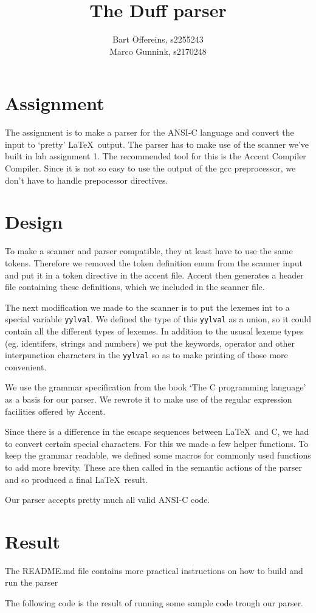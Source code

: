 \documentclass{article}
\title{The Duff parser}
\author{Bart Offereins, s2255243\\ Marco Gunnink, s2170248}
\begin{document}
\maketitle

\section*{Assignment}

The assignment is to make a parser for the ANSI-C language and convert the input to `pretty' \LaTeX \ output. The parser has to make use of the scanner we've built in lab assignment 1. The recommended tool for this is the Accent Compiler Compiler. Since it is not so easy to use the output of the gcc preprocessor, we don't have to handle prepocessor directives. 

\section*{Design}

To make a scanner and parser compatible, they at least have to use the same tokens. Therefore we removed the token definition enum from the scanner input and put it in a token directive in the accent file. Accent then generates a header file containing these definitions, which we included in the scanner file. 

The next modification we made to the scanner is to put the lexemes int to a special variable \lstinline{yylval}. We defined the type of this \lstinline{yylval} as a union, so it could contain all the different types of lexemes. In addition to the ususal lexeme types (eg. identifers, strings and numbers) we put the keywords, operator and other interpunction characters in the \lstinline{yylval} so as to make printing of those more convenient. 

We use the grammar specification from the book `The C programming language' as a basis for our parser. We rewrote it to make use of the regular expression facilities offered by Accent.

Since there is a difference in the escape sequences between \LaTeX \ and C, we had to convert certain special characters. For this we made a few helper functions. To keep the grammar readable, we defined some macros for commonly used functions to add more brevity. These are then called in the semantic actions of the parser and so produced a final \LaTeX \ result.

Our parser accepts pretty much all valid ANSI-C code.

\pagebreak

\section*{Result}

The README.md file contains more practical instructions on how to build and run the parser

The following code is the result of running some sample code trough our parser.


\end{document}
